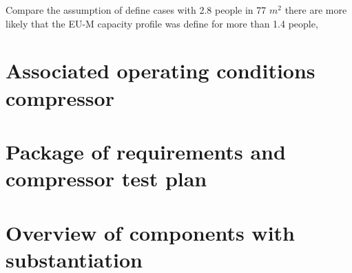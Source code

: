 \documentclass[a4paper,10pt]{article}
\begin{document}
Compare the assumption of define cases with 2.8 people in 77 $m^2$ there are more likely that the EU-M capacity profile was define for more than 1.4 people,

\section{Associated operating conditions compressor}




\section{ Package of requirements and compressor test plan}



\section{Overview of components with substantiation}






\medskip
\end{document}

